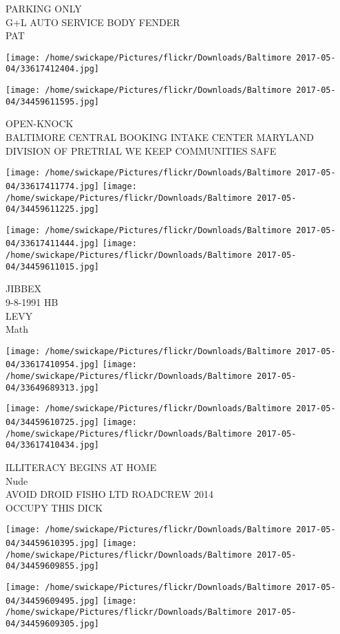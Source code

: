 \documentclass[10pt,letterpaper]{article}
\begin{document}
PARKING ONLY\\
G+L AUTO SERVICE BODY FENDER\\
PAT
\pagebreak

\texttt{[image: /home/swickape/Pictures/flickr/Downloads/Baltimore 2017-05-04/33617412404.jpg]}

\vspace{0.25in}
\texttt{[image: /home/swickape/Pictures/flickr/Downloads/Baltimore 2017-05-04/34459611595.jpg]}

OPEN{-}KNOCK\\
BALTIMORE CENTRAL BOOKING INTAKE CENTER MARYLAND DIVISION OF PRETRIAL WE KEEP COMMUNITIES SAFE
\pagebreak

\texttt{[image: /home/swickape/Pictures/flickr/Downloads/Baltimore 2017-05-04/33617411774.jpg]}
\texttt{[image: /home/swickape/Pictures/flickr/Downloads/Baltimore 2017-05-04/34459611225.jpg]}

\texttt{[image: /home/swickape/Pictures/flickr/Downloads/Baltimore 2017-05-04/33617411444.jpg]}
\texttt{[image: /home/swickape/Pictures/flickr/Downloads/Baltimore 2017-05-04/34459611015.jpg]}

JIBBEX\\
9{-}8{-}1991 HB\\
LEVY\\
Math
\pagebreak

\texttt{[image: /home/swickape/Pictures/flickr/Downloads/Baltimore 2017-05-04/33617410954.jpg]}
\texttt{[image: /home/swickape/Pictures/flickr/Downloads/Baltimore 2017-05-04/33649689313.jpg]}

\texttt{[image: /home/swickape/Pictures/flickr/Downloads/Baltimore 2017-05-04/34459610725.jpg]}
\texttt{[image: /home/swickape/Pictures/flickr/Downloads/Baltimore 2017-05-04/33617410434.jpg]}

ILLITERACY BEGINS AT HOME\\
Nude\\
AVOID DROID FISHO LTD ROADCREW 2014\\
OCCUPY THIS DICK
\pagebreak

\texttt{[image: /home/swickape/Pictures/flickr/Downloads/Baltimore 2017-05-04/34459610395.jpg]}
\texttt{[image: /home/swickape/Pictures/flickr/Downloads/Baltimore 2017-05-04/34459609855.jpg]}

\texttt{[image: /home/swickape/Pictures/flickr/Downloads/Baltimore 2017-05-04/34459609495.jpg]}
\texttt{[image: /home/swickape/Pictures/flickr/Downloads/Baltimore 2017-05-04/34459609305.jpg]}
\end{document}
